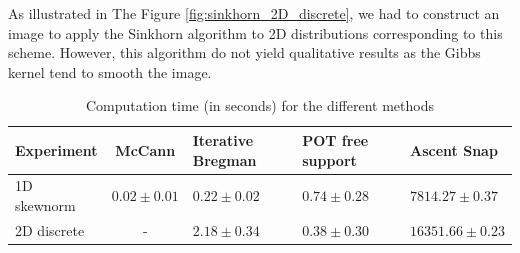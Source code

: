 As illustrated in The Figure \ref{fig:sinkhorn_2D_discrete}, we had to construct an image to apply the Sinkhorn algorithm to 2D distributions corresponding to this scheme. However, this algorithm do not yield qualitative results as the Gibbs kernel tend to smooth the image.

\begin{table}
    \begin{center}
        \begin{tabularx}{\textwidth}{>{\raggedright}m{2cm} c m{2cm} X X}
                Experiment & McCann & Iterative Bregman & POT free support & Ascent Snap \\
                \hline\hline
                1D skewnorm & $0.02 \pm 0.01$ & $0.22 \pm 0.02$ & $0.74 \pm 0.28$ & $7814.27 \pm 0.37$ \\
                2D discrete & - & $2.18 \pm 0.34$ & $0.38 \pm 0.30$ & $16351.66 \pm 0.23$ \\
        \end{tabularx}
    \end{center}
    \caption{Computation time (in seconds) for the different methods}
    \label{table:time_table}
\end{table}



